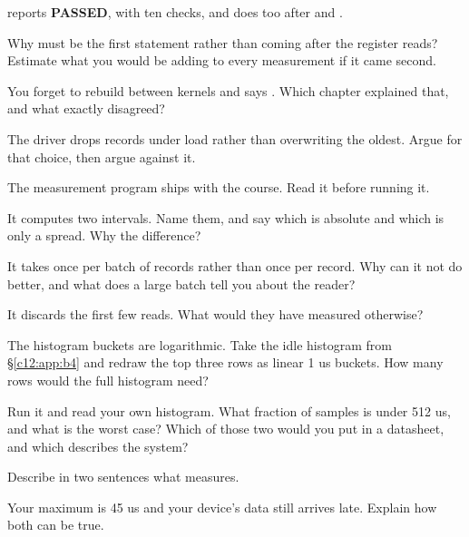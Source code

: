 \checkyourself {} reports \textbf{PASSED}, with ten checks, and  does too after  and .

 Why must  be the first statement rather than coming after the
register reads? Estimate what you would be adding to every measurement if it came second.

 You forget to rebuild between kernels and  says .
Which chapter explained that, and what exactly disagreed?

 The driver drops records under load rather than overwriting the oldest. Argue for that
choice, then argue against it.

\label{c12:ex:7}

The measurement program  ships with the course. Read it before running it.

 It computes two intervals. Name them, and say which is absolute and which is only a
spread. Why the difference?

 It takes  once per batch of records rather than once per record. Why
can it not do better, and what does a large batch tell you about the reader?

 It discards the first few reads. What would they have measured otherwise?

 The histogram buckets are logarithmic. Take the idle  histogram from
\S\ref{c12:app:b4} and redraw the top three rows as linear 1 us buckets. How many rows would the
full histogram need?

 Run it and read your own histogram. What fraction of samples is under 512 us, and what is
the worst case? Which of those two would you put in a datasheet, and which describes the system?

\label{c12:ex:8}

 Describe in two sentences what  measures.

 Your  maximum is 45 us and your device's data still arrives late. Explain
how both can be true.

